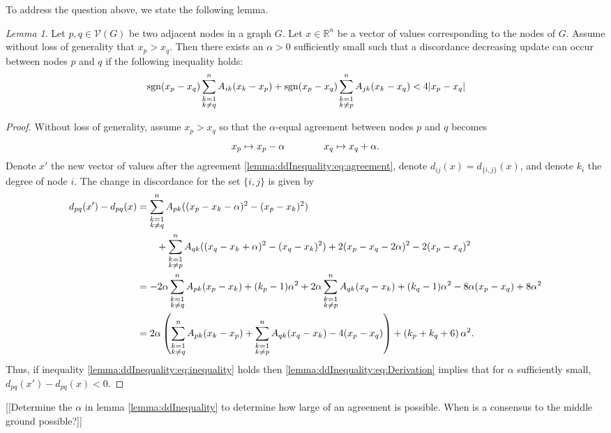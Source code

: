 \documentclass{article}
\theoremstyle{remark}
\newtheorem{lemma}{Lemma}
\newcommand{\R}[0]{\mathbb{R}}
\DeclareMathOperator{\sgn}{sgn}
\begin{document}
To address the question above, we state the following lemma.
\begin{lemma}{\label{lemma:ddInequality}}
	Let $p,q\in\mathcal{V}(G)$ be two adjacent nodes in a graph $G$. Let $x\in\R^n$ be a vector of values corresponding to the nodes of $G$. Assume without loss of generality that $x_p>x_q$. Then there exists an $\alpha>0$ sufficiently small such that a discordance decreasing update can occur between nodes $p$ and $q$ if the following inequality holds:
	\begin{equation}{\label{lemma:ddInequality:eq:inequality}}
		\sgn(x_p-x_q)\sum_{\substack{k=1\\k\neq q}}^nA_{ik}(x_k-x_p) + \sgn(x_p-x_q)\sum_{\substack{k=1\\k\neq p}}^nA_{jk}(x_k-x_q) < 4|x_p-x_q|
	\end{equation}
\end{lemma}
\begin{proof}
	Without loss of generality, assume $x_p>x_q$ so that the $\alpha$-equal agreement between nodes $p$ and $q$ becomes
	\begin{equation}{\label{lemma:ddInequality:eq:agreement}}
		x_p\mapsto x_p -\alpha \qquad\qquad x_q\mapsto x_q+\alpha.	
	\end{equation}
	Denote $x'$ the new vector of values after the agreement \eqref{lemma:ddInequality:eq:agreement}, denote $d_{ij}(x) = d_{\{i,j\}}(x)$, and denote $k_i$ the degree of node $i$. The change in discordance for the set $\{i,j\}$ is given by
	\begin{equation}{\label{lemma:ddInequality:eq:Derivation}}
		\begin{aligned}
			d_{pq}(x')-d_{pq}(x) &= \sum_{\substack{k=1\\k\neq q}}^nA_{pk}((x_p-x_k-\alpha)^2-(x_p-x_k)^2) \\
			&\qquad+\sum_{\substack{k=1\\k\neq p}}^nA_{qk}((x_q-x_k+\alpha)^2-(x_q-x_k)^2) + 2(x_p-x_q-2\alpha)^2 - 2(x_p-x_q)^2\\
			&= -2\alpha\sum_{\substack{k=1\\k\neq q}}^nA_{pk}(x_p-x_k) + (k_p-1)\alpha^2 + 2\alpha\sum_{\substack{k=1\\k\neq p}}^nA_{qk}(x_q-x_k) + (k_q-1)\alpha^2 - 8\alpha(x_p-x_q) + 8\alpha^2\\
			&= 2\alpha\left(\sum_{\substack{k=1\\k\neq q}}^nA_{pk}(x_k-x_p) + \sum_{\substack{k=1\\k\neq p}}^nA_{qk}(x_q-x_k) - 4(x_p-x_q)\right) + \left(k_p+k_q+6\right)\alpha^2. 
		\end{aligned}
	\end{equation}
	Thus, if inequality \eqref{lemma:ddInequality:eq:inequality} holds then \eqref{lemma:ddInequality:eq:Derivation} implies that for $\alpha$ sufficiently small, $d_{pq}(x')-d_{pq}(x) < 0$.
\end{proof}
[[Determine the $\alpha$ in lemma \ref{lemma:ddInequality} to determine how large of an agreement is possible.  When is a consensus to the middle ground possible?]]
\end{document}
